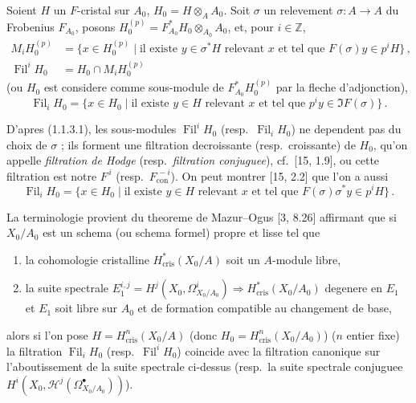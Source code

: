\documentclass[12pt,a4paper]{article}
\theoremstyle{plain}
\theoremstyle{definition}
\theoremstyle{remark}
\DeclareMathOperator{\Fil}{Fil}
\newcommand{\crys}{\mathrm{cris}}
\begin{document}
Soient $H$ un $F$-cristal sur $A_0$, $H_0 = H \otimes_A A_0$. Soit $\sigma$ un relevement $\sigma : A \to A$ du Frobenius $F_{A_0}$, posons $H_0^{(p)} = F_{A_0}^*H_0 \otimes_{A_0} A_0$, et, pour $i \in \mathbb{Z}$,
\begin{align}
M_iH_0^{(p)} &= \{x \in H_0^{(p)} \mid \text{il existe } y \in \sigma^*H \text{ relevant } x \text{ et tel que } F(\sigma)y \in p^iH\}\,, \label{eq:1.3.1.1} \\
\Fil^iH_0 &= H_0 \cap M_iH_0^{(p)} \label{eq:1.3.1.2}
\end{align}
(ou $H_0$ est considere comme sous-module de $F_{A_0}^*H_0^{(p)}$ par la fleche d'adjonction),
\begin{equation}\label{eq:1.3.1.3}
\Fil_iH_0 = \{x \in H_0 \mid \text{il existe } y \in H \text{ relevant } x \text{ et tel que } p^iy \in \Im F(\sigma)\}\,.\end{equation}

D'apres (1.1.3.1), les sous-modules $\Fil^iH_0$ (resp.\ $\Fil_iH_0$) ne dependent pas du choix de $\sigma$ ; ils forment une filtration decroissante (resp.\ croissante) de $H_0$, qu'on appelle \emph{filtration de Hodge} (resp.\ \emph{filtration conjuguee}), cf.\ [15, 1.9], ou cette filtration est notre $F^{\,i}$ (resp.\ $F_{\mathrm{con}}^{\,-i}$). On peut montrer [15, 2.2] que l'on a aussi
\begin{equation}\label{eq:1.3.1.4}
\Fil_iH_0 = \{x \in H_0 \mid \text{il existe } y \in H \text{ relevant } x \text{ et tel que } F(\sigma)\sigma^*y \in p^iH\}\,.\end{equation}

La terminologie provient du theoreme de Mazur--Ogus [3, 8.26] affirmant que si $X_0/A_0$ est un schema (ou schema formel) propre et lisse tel que
\begin{enumerate}[label=(\roman*)]
\item la cohomologie cristalline $H_{\crys}^*(X_0/A)$ soit un $A$-module libre,
\item la suite spectrale $E_1^{i,j} = H^j(X_0, \Omega_{X_0/A_0}^i) \Rightarrow H_{\crys}^*(X_0/A_0)$ degenere en $E_1$ et $E_1$ soit libre sur $A_0$ et de formation compatible au changement de base,
\end{enumerate}
alors si l'on pose $H = H_{\crys}^n(X_0/A)$ (donc $H_0 = H_{\crys}^n(X_0/A_0)$) ($n$ entier fixe) la filtration $\Fil_iH_0$ (resp.\ $\Fil^iH_0$) coincide avec la filtration canonique sur l'aboutissement de la suite spectrale ci-dessus (resp.\ la suite spectrale conjuguee $H^i(X_0, \mathcal{H}^j(\Omega_{X_0/A_0}^\bullet))$).
\end{document}
